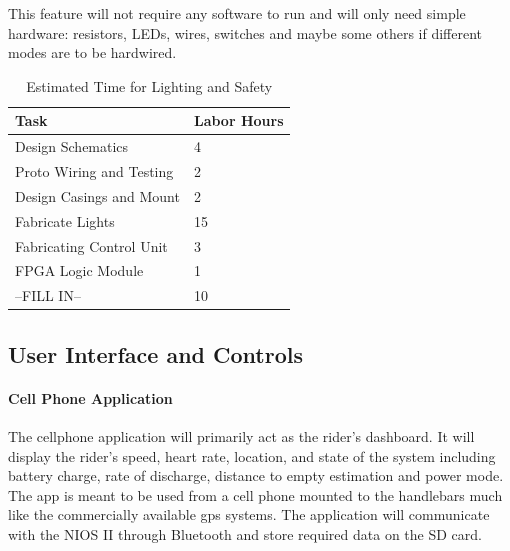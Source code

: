 \documentclass[12pt,article]{IEEEtran}
\begin{document}
            This feature will not require any software to run and will only need simple hardware: resistors, 
            LEDs, wires, switches and maybe some others if different modes are to be hardwired.  
      
        \begin{table}[H]        
            \renewcommand{\arraystretch}{1.3}
                \caption{Estimated Time for Lighting and Safety}
                
                \label{Estimated Time}
                
                \centering
                \begin{tabular}{p{5.5cm}|p{2cm}}
                \hline
                \bfseries   Task                        & \bfseries Labor Hours                         \\
                \hline\hline
                            Design Schematics           & 4                                             \\
                            Proto Wiring and Testing    & 2                                             \\  
                            Design Casings and Mount    & 2                                             \\  
                            Fabricate Lights            & 15                                            \\
                            Fabricating Control Unit    & 3                                             \\
                            FPGA Logic Module           & 1                                             \\  
                            --FILL IN--                 & 10                                            \\  
                            \hline  
                \end{tabular}
        \end{table}
    
    \subsection{\bfseries User Interface and Controls}
        \paragraph{\bfseries Cell Phone Application}
            The cellphone application will primarily act as the rider’s dashboard. It will display the 
            rider’s speed, heart rate, location, and state of the system including battery charge, rate 
            of discharge, distance to empty estimation and power mode. The app is meant to be used from 
            a cell phone mounted to the handlebars much like the commercially available gps systems. The
            application will communicate with the NIOS II through Bluetooth and store required data on the 
            SD card. 
            
\end{document}
